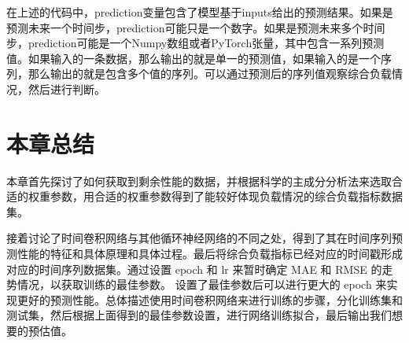 在上述的代码中，prediction变量包含了模型基于inputs给出的预测结果。如果是预测未来一个时间步，prediction可能只是一个数字。如果是预测未来多个时间步，prediction可能是一个Numpy数组或者PyTorch张量，其中包含一系列预测值。如果输入的一条数据，那么输出的就是单一的预测值，如果输入的是一个序列，那么输出的就是包含多个值的序列。可以通过预测后的序列值观察综合负载情况，然后进行判断。

\section{本章总结}

本章首先探讨了如何获取到剩余性能的数据，并根据科学的主成分分析法来选取合适的权重参数，用合适的权重参数得到了能较好体现负载情况的综合负载指标数据集。

接着讨论了时间卷积网络与其他循环神经网络的不同之处，得到了其在时间序列预测性能的特征和具体原理和具体过程。最后将综合负载指标已经对应的时间戳形成对应的时间序列数据集。通过设置 epoch 和 lr 来暂时确定 MAE 和 RMSE 的走势情况，以获取训练的最佳参数。
设置了最佳参数后可以进行更大的 epoch 来实现更好的预测性能。总体描述使用时间卷积网络来进行训练的步骤，分化训练集和测试集，然后根据上面得到的最佳参数设置，进行网络训练拟合，最后输出我们想要的预估值。
